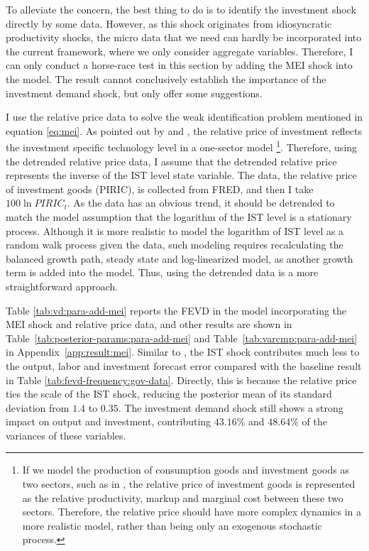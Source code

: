 To alleviate the concern, the best thing to do is to identify the investment shock directly by some data. However, as this shock originates from idiosyncratic productivity shocks, the micro data that we need can hardly be incorporated into the current framework, where we only consider aggregate variables. Therefore, I can only conduct a horse-race test in this section by adding the MEI shock into the model. The result cannot conclusively establish the importance of the investment demand shock, but only offer some suggestions.

I use the relative price data to solve the weak identification problem mentioned in equation \eqref{eq:mei}. As pointed out by \cite{greenwoodLongRunImplicationsInvestmentSpecific1997a} and \cite{fisherDynamicEffectsNeutral2006}, the relative price of investment reflects the investment specific technology level in a one-sector model \footnote{If we model the production of consumption goods and investment goods as two sectors, such as in \cite{mouraInvestmentShocksSticky2018}, the relative price of investment goods is represented as the relative productivity, markup and marginal cost between these two sectors. Therefore, the relative price should have more complex dynamics in a more realistic model, rather than being only an exogenous stochastic process.}. Therefore, using the detrended relative price data, I assume that the detrended relative price represents the inverse of the IST level state variable. The data, the relative price of investment goods (PIRIC), is collected from FRED, and then I take $100\ln PIRIC_t$. As the data has an obvious trend, it should be detrended to match the model assumption that the logarithm of the IST level is a stationary process. Although it is more realistic to model the logarithm of IST level as a random walk process given the data, such modeling requires recalculating the balanced growth path, steady state and log-linearized model, as another growth term is added into the model. Thus, using the detrended data is a more straightforward approach.



Table \ref{tab:vd:para-add-mei} reports the FEVD in the model incorporating the MEI shock and relative price data, and other results are shown in Table~\ref{tab:posterior-params:para-add-mei} and Table~\ref{tab:varcmp:para-add-mei} in Appendix~\ref{app:result:mei}. Similar to \cite{justinianoInvestmentShocksRelative2011}, the IST shock contributes much less to the output, labor and investment forecast error compared with the baseline result in Table \ref{tab:fevd-frequency:gov-data}. Directly, this is because the relative price ties the scale of the IST shock, reducing the posterior mean of its standard deviation from $1.4$ to $0.35$. The investment demand shock still shows a strong impact on output and investment, contributing $43.16\%$ and $48.64\%$ of the variances of these variables.
